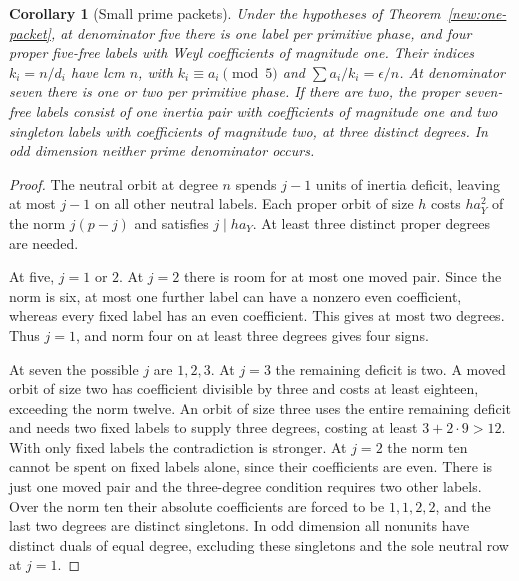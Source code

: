 \documentclass[11pt]{amsart}
\numberwithin{equation}{section}
\newtheorem{corollary}[theorem]{Corollary}
\theoremstyle{definition}
\theoremstyle{plain}
\begin{document}
\begin{corollary}[Small prime packets]\label{new:five-reduction}
Under the hypotheses of Theorem~\ref{new:one-packet},
at denominator five there is one label per primitive phase, and four
proper five-free labels with Weyl coefficients of magnitude one. Their indices $k_i=n/d_i$ have lcm $n$, with $k_i\equiv a_i\pmod5$ and $\sum a_i/k_i=\epsilon/n$.
At denominator seven there is one or two per primitive phase. If
there are two, the proper seven-free labels consist of one inertia
pair with coefficients of magnitude one and two singleton labels
with coefficients of magnitude two, at three distinct degrees.
In odd dimension neither prime denominator occurs.
\end{corollary}
\begin{proof}
The neutral orbit at degree $n$ spends $j-1$ units of inertia
deficit, leaving at most $j-1$ on all other neutral labels.
Each proper orbit of size $h$ costs $h a_Y^2$ of the norm
$j(p-j)$ and satisfies $j\mid h a_Y$. At least three distinct
proper degrees are needed.

At five, $j=1$ or $2$. At $j=2$ there is room for at most one
moved pair. Since the norm is six, at most one further label can
have a nonzero even coefficient, whereas every fixed label has an
even coefficient. This gives at most two degrees. Thus $j=1$,
and norm four on at least three degrees gives four signs.

At seven the possible $j$ are $1,2,3$. At $j=3$ the remaining
deficit is two. A moved orbit of size two has coefficient divisible
by three and costs at least eighteen, exceeding the norm twelve.
An orbit of size three uses the entire remaining deficit and needs
two fixed labels to supply three degrees, costing at least
$3+2\cdot9>12$. With only fixed labels the contradiction is stronger.
At $j=2$ the norm ten cannot be spent on fixed labels alone, since
their coefficients are even. There is just one moved pair and the
three-degree condition requires two other labels. Over the norm
ten their absolute coefficients are forced to be $1,1,2,2$,
and the last two degrees are distinct singletons. In odd dimension
all nonunits have distinct duals of equal degree, excluding these
singletons and the sole neutral row at $j=1$.
\end{proof}
\end{document}
